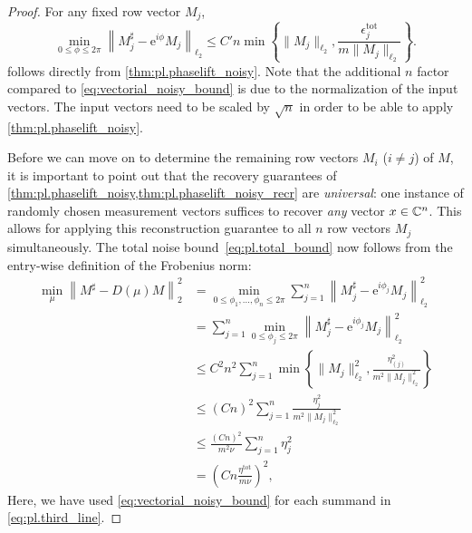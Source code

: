 \begin{proof}
  For any fixed row vector ${M}_j$,
  \[
    \min_{0 \leq \phi \leq 2 \pi}\left\| {M}_j^\sharp - \mathrm{e}^{i \phi} {M}_j \right\|_{\ell_2} \leq C' n \min
    \left\{
    \| {M}_j \|_{\ell_2}, \frac{ \epsilon_j^{\mathrm{tot}}}{m \| {M}_j \|_{\ell_2}}
    \right\}.
    \label{eq:noisy_reconstruction_vectorial_bound}
  \]
  follows directly from \cref{thm:pl.phaselift_noisy}.
  Note that the additional $n$ factor compared to \cref{eq:vectorial_noisy_bound} is due to the normalization of the input vectors.
  The input vectors need to be scaled by $\sqrt{n}$ in order to be able to apply \cref{thm:pl.phaselift_noisy}.

  Before we can move on to determine the remaining row vectors ${M}_{i}$ ($i \neq j$) of ${M}$, it is important to point out that the recovery guarantees of \cref{thm:pl.phaselift_noisy,thm:pl.phaselift_noisy_recr} are \emph{universal}: one instance of randomly chosen measurement vectors suffices to recover \emph{any} vector ${x} \in {\mathbb{C}}^n$.
  This allows for applying this reconstruction guarantee to all $n$ row vectors ${M}_j$ simultaneously.
  The total noise bound~\eqref{eq:pl.total_bound} now follows from the entry-wise definition of the Frobenius norm:
  \begin{align}
    \min_{{\mu}}\left\|  {M}^\sharp -  {D} ({\mu}) {M} \right\|_2 ^2
    &= \min_{0 \leq \phi_1,\ldots,\phi_n \leq 2 \pi}
    \sum_{j=1}^n \left\| {M}_j^\sharp - \mathrm{e}^{i \phi_j} {M}_j \right\|_{\ell_2}^2 \\
    &= \sum_{j=1}^n \min_{0 \leq \phi_j \leq 2 \pi} \left\| {M}_j^\sharp - \mathrm{e}^{i \phi_j} {M}_j \right\|_{\ell_2}^2 \\
    \label{eq:pl.third_line}
    & \leq C^2 n^2 \sum_{j=1}^n  \min \left\{ \| {M}_j \|_{\ell_2}^2, \frac{ \eta_{(j)}^2}{m^2 \|{M}_j \|_{\ell_2}^2} \right\} \\
    &\leq \left(C n\right)^2 \sum_{j=1}^n \frac{\eta_{j}^2}{m^2 \|{M}_j \|_{\ell_2}^2} \\
    & \leq \frac{\left(Cn \right)^2}{m^2 \nu} \sum_{j=1}^n \eta_{j}^2 \\
    &= \left( C n \frac{\eta^{\mathrm{tot}}}{m \nu} \right)^2,
  \end{align}
  Here, we have used \cref{eq:vectorial_noisy_bound} for each summand in \cref{eq:pl.third_line}.
\end{proof}


